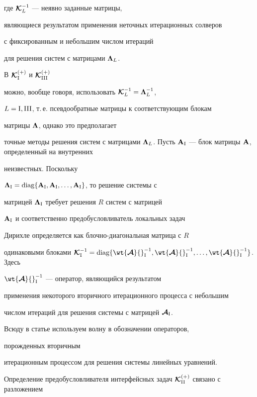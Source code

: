 где ${\boldsymbol{\cal {K}} }_{L}^{-1}$ --- неявно заданные матрицы,


являющиеся результатом применения неточных итерационных солверов


с фиксированным и небольшим числом итераций


для решения систем с матрицами ${\boldsymbol {\Lambda}}_L$. 


В ${\boldsymbol{\cal {K}}}_{\mathrm{I}}^{(+)}$ и ${\boldsymbol{\cal {K}}}_{{\mathrm{III}}}^{(+)}$


можно, вообще говоря, использовать ${\boldsymbol{\cal {K}}}_L^{-1}={\boldsymbol {\Lambda}}_L^{-1}$,


$L={\mathrm{I}},{\mathrm{III}}$, т.\,е. псевдообратные матрицы к соответствующим блокам 


матрицы ${\boldsymbol {\Lambda}}$, однако это предполагает


точные методы решения систем с матрицами ${\bi \Lambda}_L$. Пусть ${\bold


A}_\ri$ --- блок матрицы ${\bold A}$, определенный на внутренних 


неизвестных. Поскольку


${\bi \Lambda }_{\ri}=\diag \{ {\bold A}_\ri,


{\bold A}_\ri, \dotsc, {\bold A}_\ri \}$, то решение системы с


матрицей ${\boldsymbol {\Lambda}}_{\mathrm{I}}$ требует решения $R$ систем с матрицей 


${\bold A}_{\mathrm{I}}$ и соответственно предобусловливатель локальных задач 


Дирихле определяется как блочно-диагональная матрица с $R$ 


одинаковыми блоками ${\bc K }_{\ri}^{-1}=\diag \{


\wt {{\bi {\mc A}}}{}_\ri^{-1},


\wt{{\bi {\mc A}}}{}_\ri^{-1}, \dotsc, \wt{{\bi {\mc A}}}{}_\ri^{-1}\}$. Здесь


$\wt{{\bi {\mc A}}}{}_\ri^{-1}$ --- оператор, являющийся результатом 


применения некоторого вторичного итерационного процесса с небольшим 


числом итераций для решения системы с матрицей ${\boldsymbol {\cal {A}}}_{\mathrm{I}}$. 


Всюду в статье используем волну в обозначении операторов, 


порожденных вторичным


итерационным процессом для решения системы линейных уравнений.





Определение предобусловливателя интерфейсных задач $\bi{\cal


K}_{\rii}^{(+)}$ связано с разложением


